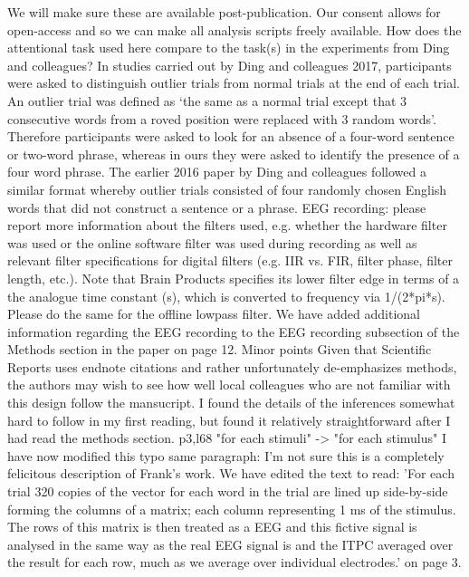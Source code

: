 \documentclass[10pt,letterpaper]{article}
\begin{document}
\color{blue}
We will make sure these are available post-publication. Our consent allows for open-access and so we can make all analysis scripts freely available.
\color{black}
\newline
\noindent
How does the attentional task used here compare to the task(s) in the experiments from Ding and colleagues?
\color{blue}
In studies carried out by Ding and colleagues 2017, participants were asked to distinguish outlier trials from normal trials at the end of each trial. An outlier trial was defined as ‘the same as a normal trial except that 3 consecutive words from a roved position were replaced with 3 random words’. Therefore participants were asked to look for an absence of a four-word sentence or two-word phrase, whereas in ours they were asked to identify the presence of a four word phrase. The earlier 2016 paper by Ding and colleagues followed a similar format whereby outlier trials consisted of four randomly chosen English words that did not construct a sentence or a phrase.
\color{black}
\newline
\noindent
EEG recording: please report more information about the filters used, e.g. whether the hardware filter was used or the online software filter was used during recording as well as relevant filter specifications for digital filters (e.g. IIR vs. FIR, filter phase, filter length, etc.). Note that Brain Products specifies its lower filter edge in terms of a the analogue time constant (s), which is converted to frequency via 1/(2*pi*s). Please do the same for the offline lowpass filter. 
\color{blue}
We have added additional information regarding the EEG recording to the EEG recording subsection of the Methods section in the paper on page 12.
\color{black}
\newline
\noindent
Minor points 
\newline
\noindent
Given that Scientific Reports uses endnote citations and rather unfortunately de-emphasizes methods, the authors may wish to see how well local colleagues who are not familiar with this design follow the mansucript. I found the details of the inferences somewhat hard to follow in my first reading, but found it relatively straightforward after I had read the methods section. 
\newline
\noindent
p3,l68 "for each stimuli" -> "for each stimulus"
\color{blue}
I have now modified this typo
\color{black}
same paragraph: I'm not sure this is a completely felicitous description of Frank's work. 
\color{blue}
We have edited the text to read: 'For each trial 320 copies of the vector for each word in the trial are lined up side-by-side forming the columns of a matrix; each column representing 1 ms of the stimulus. The rows of this matrix is then treated as a EEG and this fictive signal is analysed in the same way as the real EEG signal is and the ITPC averaged over the result for each row, much as we average over individual electrodes.' on page 3.
\end{document}
